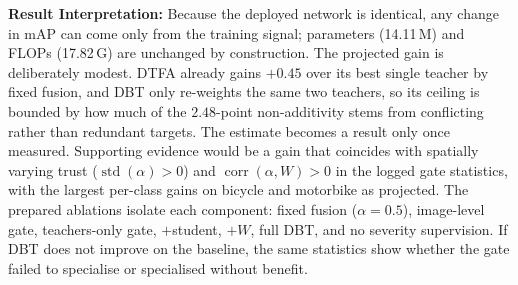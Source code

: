 \documentclass[8pt,a4paper]{article}
\begin{document}
\vspace{-5pt}

\textbf{Result Interpretation:}
Because the deployed network is identical, any change in mAP can come only from the training signal; parameters (14.11\,M) and FLOPs (17.82\,G) are unchanged by construction. The projected gain is deliberately modest. DTFA already gains $+0.45$ over its best single teacher by fixed fusion, and DBT only re-weights the same two teachers, so its ceiling is bounded by how much of the $2.48$-point non-additivity stems from conflicting rather than redundant targets. The estimate becomes a result only once measured. Supporting evidence would be a gain that coincides with spatially varying trust ($\operatorname{std}(\alpha)>0$) and $\operatorname{corr}(\alpha,W)>0$ in the logged gate statistics, with the largest per-class gains on bicycle and motorbike as projected. The prepared ablations isolate each component: fixed fusion ($\alpha{=}0.5$), image-level gate, teachers-only gate, $+$student, $+W$, full DBT, and no severity supervision. If DBT does not improve on the baseline, the same statistics show whether the gate failed to specialise or specialised without benefit.
\end{document}
